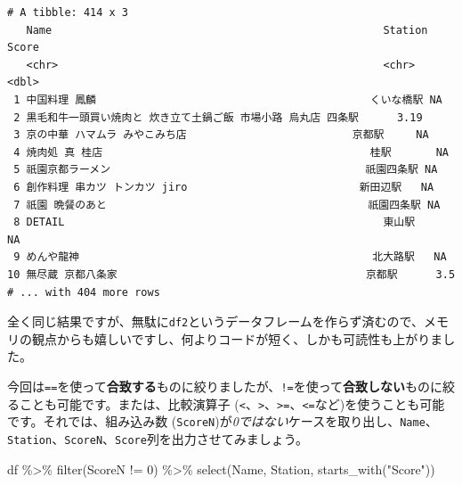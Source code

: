 \documentclass[
  a4paper,
  pandoc,
  ja=standard,
  jafont=haranoaji]{bxjsbook}
\newenvironment{Shaded}{\begin{snugshade}}{\end{snugshade}}
\newcommand{\DecValTok}[1]{\textcolor[rgb]{0.68,0.00,0.00}{#1}}
\newcommand{\FunctionTok}[1]{\textcolor[rgb]{0.28,0.35,0.67}{#1}}
\newcommand{\NormalTok}[1]{\textcolor[rgb]{0.00,0.48,0.65}{#1}}
\newcommand{\SpecialCharTok}[1]{\textcolor[rgb]{0.37,0.37,0.37}{#1}}
\newcommand{\StringTok}[1]{\textcolor[rgb]{0.13,0.47,0.30}{#1}}
\begin{document}
\begin{verbatim}
# A tibble: 414 x 3
   Name                                                    Station    Score
   <chr>                                                   <chr>      <dbl>
 1 中国料理 鳳麟                                           くいな橋駅 NA   
 2 黒毛和牛一頭買い焼肉と 炊き立て土鍋ご飯 市場小路 烏丸店 四条駅      3.19
 3 京の中華 ハマムラ みやこみち店                          京都駅     NA   
 4 焼肉処 真 桂店                                          桂駅       NA   
 5 祇園京都ラーメン                                        祇園四条駅 NA   
 6 創作料理 串カツ トンカツ jiro                           新田辺駅   NA   
 7 祇園 晩餐のあと                                         祇園四条駅 NA   
 8 DETAIL                                                  東山駅     NA   
 9 めんや龍神                                              北大路駅   NA   
10 無尽蔵 京都八条家                                       京都駅      3.5 
# ... with 404 more rows
\end{verbatim}

全く同じ結果ですが、無駄に\texttt{df2}というデータフレームを作らず済むので、メモリの観点からも嬉しいですし、何よりコードが短く、しかも可読性も上がりました。

今回は\texttt{==}を使って\textbf{合致する}ものに絞りましたが、\texttt{!=}を使って\textbf{合致しない}ものに絞ることも可能です。または、比較演算子
(\texttt{\textless{}}、\texttt{\textgreater{}}、\texttt{\textgreater{}=}、\texttt{\textless{}=}など)を使うことも可能です。それでは、組み込み数
(\texttt{ScoreN})が\emph{0ではない}ケースを取り出し、\texttt{Name}、\texttt{Station}、\texttt{ScoreN}、\texttt{Score}列を出力させてみましょう。

\begin{Shaded}
\begin{Highlighting}[numbers=left,,]
\NormalTok{df }\SpecialCharTok{\%\textgreater{}\%}
  \FunctionTok{filter}\NormalTok{(ScoreN }\SpecialCharTok{!=} \DecValTok{0}\NormalTok{) }\SpecialCharTok{\%\textgreater{}\%}
  \FunctionTok{select}\NormalTok{(Name, Station, }\FunctionTok{starts\_with}\NormalTok{(}\StringTok{"Score"}\NormalTok{))}
\end{Highlighting}
\end{Shaded}
\end{document}

